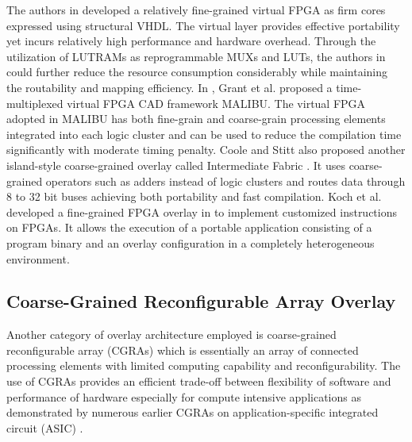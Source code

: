 The authors in \cite{lysecky2005firm} developed a relatively fine-grained virtual FPGA as firm cores expressed using structural VHDL. The virtual layer provides effective portability yet incurs relatively high performance and hardware overhead. Through the utilization of LUTRAMs as reprogrammable MUXs and LUTs, the authors in \cite{brant2012ZUMA}could further reduce the resource consumption considerably while maintaining the routability and mapping efficiency. In \cite{grant2011malibu}, Grant et al. proposed a time-multiplexed virtual FPGA CAD framework MALIBU. The virtual FPGA adopted in MALIBU has both fine-grain and coarse-grain processing elements integrated into each logic cluster and can be used to reduce the compilation time significantly with moderate timing penalty. Coole and Stitt also proposed another island-style coarse-grained overlay called Intermediate Fabric \cite{coole2010intermediate}. It uses coarse-grained operators such as adders instead of logic clusters and routes data through 8 to 32 bit buses achieving both portability and fast compilation. Koch et al. developed a fine-grained FPGA overlay in \cite{koch2013efficient} to implement customized instructions on FPGAs. It allows the execution of a portable application consisting of a program binary and an overlay configuration in a completely heterogeneous environment. 

\subsection{Coarse-Grained Reconfigurable Array Overlay}
Another category of overlay architecture employed is coarse-grained reconfigurable array (CGRAs) \cite{ferreira2011fpga, kissler2006dynamically, shukla2006quku, lin2012energy, capalijia2013pipelined} which is essentially an array of connected processing elements with limited computing capability and reconfigurability. The use of CGRAs provides an efficient trade-off between flexibility of software and performance of hardware especially for compute intensive applications as demonstrated by numerous earlier CGRAs on application-specific integrated circuit (ASIC) \cite{tessier2001reconfigurable, compton2002reconfigurable}.

